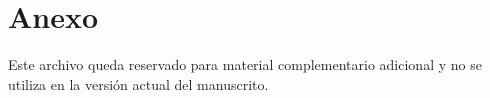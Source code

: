 \chapter{Anexo}
\label{ch:an1}

Este archivo queda reservado para material complementario adicional y no se utiliza en la versión actual del manuscrito.

